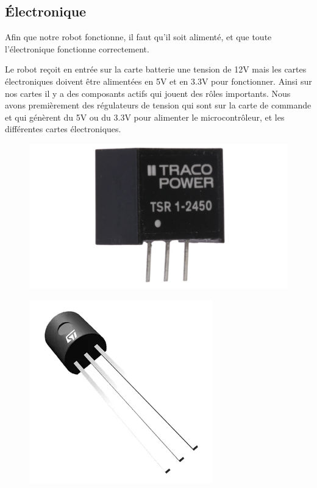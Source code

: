 \subsection{Électronique}

Afin que notre robot fonctionne, il faut qu'il soit alimenté, et que toute l'électronique fonctionne correctement.

Le robot reçoit en entrée sur la carte batterie une tension de 12V mais les cartes électroniques doivent être alimentées en 5V et en 3.3V pour fonctionner. 
Ainsi sur nos cartes il y a des composants actifs qui jouent des rôles importants.
Nous avons premièrement des régulateurs de tension qui sont sur la carte de commande et qui génèrent du 5V ou du 3.3V pour alimenter le microcontrôleur, et les différentes cartes électroniques.

\begin{figure}[H]
\centering
\begin{minipage}{.5\textwidth}
  \centering
  \includegraphics[width=.8\linewidth]{img/composants/tsr.png}
  \label{fig:tsr}
\end{minipage}%
\begin{minipage}{.5\textwidth}
  \centering
  \includegraphics[width=.8\linewidth]{img/composants/l78l.png}
  \label{fig:l78l}
\end{minipage}
\end{figure}

